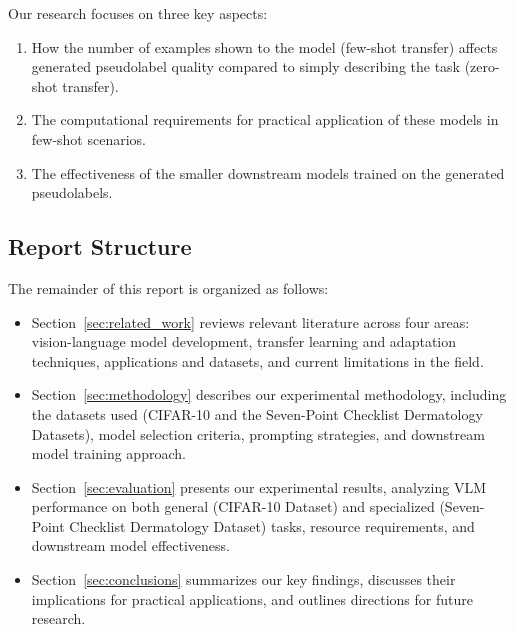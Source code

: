 \documentclass[../ShajiS_RnDReport.tex]{subfiles}
\begin{document}
Our research focuses on three key aspects: 
\begin{enumerate}
    \item How the number of examples shown to the model (few-shot transfer) affects generated pseudolabel quality compared to simply describing the task (zero-shot transfer).
    \item The computational requirements for practical application of these models in few-shot scenarios.
    \item The effectiveness of the smaller downstream models trained on the generated pseudolabels.
\end{enumerate}

\subsection{Report Structure}
\label{sec:introduction:report_structure}
The remainder of this report is organized as follows:

\begin{itemize}
    \item Section~\ref{sec:related_work} reviews relevant literature across four areas: vision-language model development, transfer learning and adaptation techniques, applications and datasets, and current limitations in the field.
    
    \item Section~\ref{sec:methodology} describes our experimental methodology, including the datasets used (CIFAR-10 and the Seven-Point Checklist Dermatology Datasets), model selection criteria, prompting strategies, and downstream model training approach.
    
    \item Section~\ref{sec:evaluation} presents our experimental results, analyzing VLM performance on both general (CIFAR-10 Dataset) and specialized (Seven-Point Checklist Dermatology Dataset) tasks, resource requirements, and downstream model effectiveness.
    
    \item Section~\ref{sec:conclusions} summarizes our key findings, discusses their implications for practical applications, and outlines directions for future research.
\end{itemize}
\end{document}

